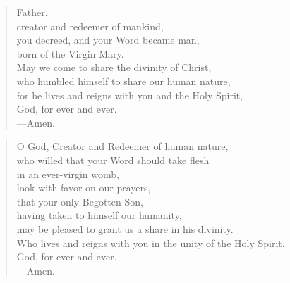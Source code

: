 \prayer

\setlength{\vleftmargin}{\prayerleftmargini}

\begin{verse}
Father,\\
creator and redeemer of mankind,\\
you decreed, and your Word became man,\\
born of the Virgin Mary.\\
May we come to share the divinity of Christ,\\
who humbled himself to share our human nature,\\
for he lives and reigns with you and the Holy Spirit,\\
God, for ever and ever. \\
{\color{red}---\thinspace}Amen.
\end{verse}


\begin{verse}
O God, Creator and Redeemer of human nature,\\
who willed that your Word should take flesh\\
in an ever-virgin womb,\\
look with favor on our prayers,\\
that your only Begotten Son,\\
 having taken to himself our humanity,\\
may be pleased to grant us a share in his divinity.\\
Who lives and reigns with you in the unity of the Holy Spirit,\\
God, for ever and ever.\\
{\color{red}---\thinspace}Amen.

\end{verse}

\setlength{\vleftmargin}{\defleftmargini}